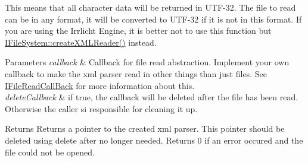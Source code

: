This means that all character data will be returned in U\+T\+F-\/32. The file to read can be in any format, it will be converted to U\+T\+F-\/32 if it is not in this format. If you are using the Irrlicht Engine, it is better not to use this function but \hyperlink{classirr_1_1io_1_1IFileSystem_a167c9fa159d16ee5c56c074636b0865e}{I\+File\+System\+::create\+X\+M\+L\+Reader()} instead. 
\begin{DoxyParams}{Parameters}
{\em callback} & Callback for file read abstraction. Implement your own callback to make the xml parser read in other things than just files. See \hyperlink{classirr_1_1io_1_1IFileReadCallBack}{I\+File\+Read\+Call\+Back} for more information about this. \\
\hline
{\em delete\+Callback} & if true, the callback will be deleted after the file has been read. Otherwise the caller si responsible for cleaning it up. \\
\hline
\end{DoxyParams}
\begin{DoxyReturn}{Returns}
Returns a pointer to the created xml parser. This pointer should be deleted using \textquotesingle{}delete\textquotesingle{} after no longer needed. Returns 0 if an error occured and the file could not be opened. 
\end{DoxyReturn}
